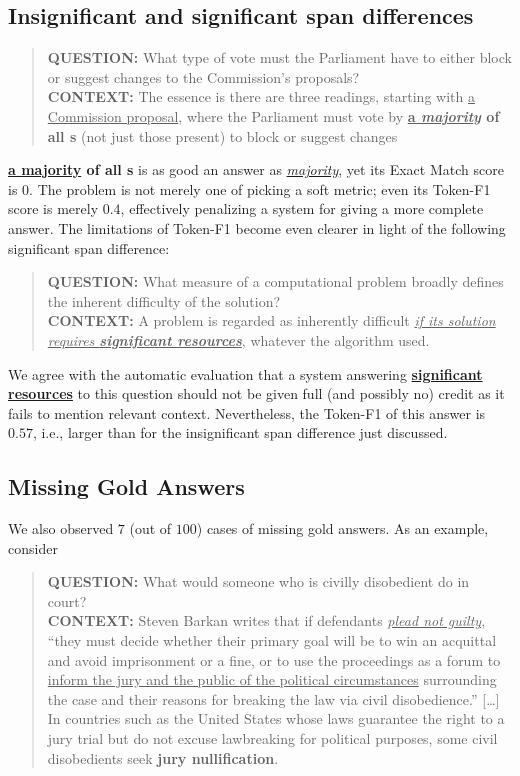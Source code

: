 \subsection{Insignificant and significant span differences}
\begin{quote}
    {\bf QUESTION:}
    What type of vote must the Parliament have to either block or suggest changes to the Commission's proposals? \\
    {\bf CONTEXT:}
    The essence is there are three readings, starting with \underline{a Commission proposal}, where the Parliament must vote by \textbf{\underline{a \textit{majority}} of all s} (not just those present) to block or suggest changes
\end{quote}
\textbf{\underline{a majority} of all s} is as good an answer as \textit{\underline{majority}},
yet its Exact Match score is $0$.  The problem is not merely one of picking a soft metric;
even its Token-F1 score is merely  $0.4$, effectively penalizing a system for giving a more complete
answer.  The limitations of Token-F1 become even clearer in light of the following significant span difference:
\begin{quote}
    {\bf QUESTION:} What measure of a computational problem broadly
    defines the inherent difficulty of the solution?  \\
   {\bf CONTEXT:}
    A problem is regarded as inherently difficult
    \underline{\textit{if its solution requires \textbf{significant
          resources}}}, whatever the algorithm used.
\end{quote}

We agree with the automatic evaluation that a system answering
\underline{\textbf{significant resources}} to this question should not
be given full (and possibly no) credit as it fails to mention relevant
context.
Nevertheless, the Token-F1 of this answer is $0.57$, i.e., larger than
for the insignificant span difference just discussed.

\subsection{Missing Gold Answers}

We also observed $7$ (out of $100$) cases of missing gold answers.  As an example, consider
\begin{quote}
    {\bf QUESTION:}
    What would someone who is civilly disobedient do in court?
 \\
    {\bf CONTEXT:} 
    Steven Barkan writes that if defendants \textit{\underline{plead not guilty}}, ``they must decide whether their primary goal will be to win an acquittal and avoid imprisonment or a fine, or to use the proceedings as a forum to \uline{inform the jury and the public of the political circumstances} surrounding the case and their reasons for breaking the law via civil disobedience.'' [\dots] \\
    In countries such as the United States whose laws guarantee the right to a jury trial but do not excuse lawbreaking for political purposes, some civil disobedients seek \textbf{jury nullification}.
\end{quote}

